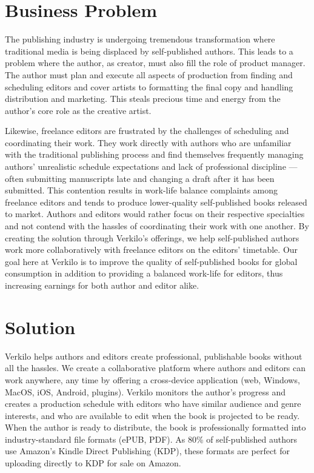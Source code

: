 \documentclass[10pt,openany]{book}
\begin{document}
\hypertarget{business-problem}{%
\section{Business Problem}\label{business-problem}}

The publishing industry is undergoing tremendous transformation where
traditional media is being displaced by self-published authors. This
leads to a problem where the author, as creator, must also fill the role
of product manager. The author must plan and execute all aspects of
production from finding and scheduling editors and cover artists to
formatting the final copy and handling distribution and marketing. This
steals precious time and energy from the author's core role as the
creative artist.

Likewise, freelance editors are frustrated by the challenges of
scheduling and coordinating their work. They work directly with authors
who are unfamiliar with the traditional publishing process and find
themselves frequently managing authors' unrealistic schedule
expectations and lack of professional discipline ---often submitting
manuscripts late and changing a draft after it has been submitted. This
contention results in work-life balance complaints among freelance
editors and tends to produce lower-quality self-published books released
to market. Authors and editors would rather focus on their respective
specialties and not contend with the hassles of coordinating their work
with one another. By creating the solution through Verkilo's offerings,
we help self-published authors work more collaboratively with freelance
editors on the editors' timetable. Our goal here at Verkilo is to
improve the quality of self-published books for global consumption in
addition to providing a balanced work-life for editors, thus increasing
earnings for both author and editor alike.

\hypertarget{solution}{%
\section{Solution}\label{solution}}

Verkilo helps authors and editors create professional, publishable books
without all the hassles. We create a collaborative platform where
authors and editors can work anywhere, any time by offering a
cross-device application (web, Windows, MacOS, iOS, Android, plugins).
Verkilo monitors the author's progress and creates a production schedule
with editors who have similar audience and genre interests, and who are
available to edit when the book is projected to be ready. When the
author is ready to distribute, the book is professionally formatted into
industry-standard file formats (ePUB, PDF). As 80\% of self-published
authors use Amazon's Kindle Direct Publishing (KDP), these formats are
perfect for uploading directly to KDP for sale on Amazon.
\end{document}
